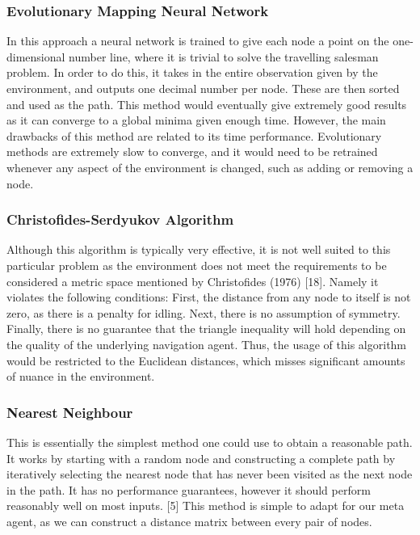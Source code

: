 \documentclass{article}
\begin{document}
	\subsubsection{Evolutionary Mapping Neural Network}
	\label{evol_nn}
	In this approach a neural network is trained to give each node a point on the one-dimensional number line, where it is trivial to solve the travelling salesman problem. In order to do this, it takes in the entire observation given by the environment, and outputs one decimal number per node. These are then sorted and used as the path. This method would eventually give extremely good results as it can converge to a global minima given enough time. However, the main drawbacks of this method are related to its time performance. Evolutionary methods are extremely slow to converge, and it would need to be retrained whenever any aspect of the environment is changed, such as adding or removing a node.
	
	\subsubsection{Christofides-Serdyukov Algorithm}
	Although this algorithm is typically very effective, it is not well suited to this particular problem as the environment does not meet the requirements to be considered a metric space  mentioned by Christofides (1976) [18]. Namely it violates the following conditions: First, the distance from any node to itself is not zero, as there is a penalty for idling. Next, there is no assumption of symmetry. Finally, there is no guarantee that the triangle inequality will hold depending on the quality of the underlying navigation agent. Thus, the usage of this algorithm would be restricted to the Euclidean distances, which misses significant amounts of nuance in the environment.
	
	\subsubsection{Nearest Neighbour}
	\label{nearest_neighbour}
	This is essentially the simplest method one could use to obtain a reasonable path. It works by starting with a random node and constructing a complete path by iteratively selecting the nearest node that has never been visited as the next node in the path. It has no performance guarantees, however it should perform reasonably well on most inputs. [5] This method is simple to adapt for our meta agent, as we can construct a distance matrix between every pair of nodes.
	
\end{document}
